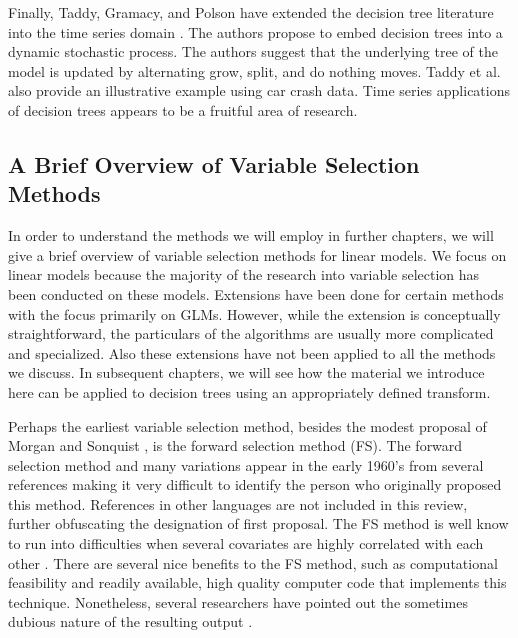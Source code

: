 Finally, Taddy, Gramacy, and Polson have extended the decision tree literature into the time series domain \cite{taddy2011dynamic}. The authors propose to embed decision trees into a dynamic stochastic process. The authors suggest that the underlying tree of the model is updated by alternating grow, split, and do nothing moves. Taddy et al. also provide an illustrative example using car crash data. Time series applications of decision trees appears to be a fruitful area of research. 

\subsection{A Brief Overview of Variable Selection Methods}

In order to understand the methods we will employ in further chapters, we will give a brief overview of variable selection methods for linear models. We focus on linear models because the majority of the research into variable selection has been conducted on these models. Extensions have been done for certain methods with the focus primarily on GLMs. However, while the extension is conceptually straightforward, the particulars of the algorithms are usually more complicated and specialized. Also these extensions have not been applied to all the methods we discuss. In subsequent chapters, we will see how the material we introduce here can be applied to decision trees using an appropriately defined transform. 

Perhaps the earliest variable selection method, besides the modest proposal of Morgan and Sonquist \cite{morgan1963problems}, is the forward selection method (FS). The forward selection method and many variations appear in the early 1960's from several references making it very difficult to identify the person who originally proposed this method. References in other languages are not included in this review, further obfuscating the designation of first proposal. The FS method is well know to run into difficulties when several covariates  are highly correlated with each other \cite{miller1984selection}. There are several nice benefits to the FS method, such as computational feasibility and readily available, high quality computer code that implements this technique. Nonetheless, several researchers have pointed out the sometimes dubious nature of the resulting output \cite{halvorson1960regression}. 

